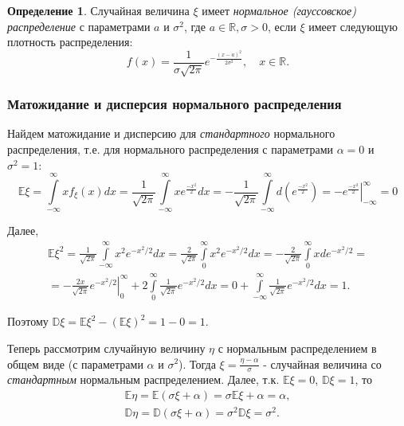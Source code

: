 \documentclass[oneside,final,14pt]{extreport}
\theoremstyle{plain}
\theoremstyle{definition}
\newtheorem*{defn}{Определение}
\theoremstyle{named}
\begin{document}
\begin{defn}
    Случайная величина $\xi$ имеет {\it нормальное (гауссовское) распределение} с параметрами $a$ и $\sigma^2$, где $a \in \mathbb{R}, \sigma > 0$, если $\xi$ имеет следующую плотность распределения: 
$$f(x)=\frac{1}{\sigma \sqrt{2 \pi}} e^{-\frac{(x-a)^{2}}{2 \sigma^{2}}}, \quad x \in \mathbb{R}.$$
\end{defn}

\subsubsection{Матожидание и дисперсия нормального распределения}

Найдем матожидание и дисперсию для {\it стандартного} нормального распределения, т.е. для нормального распределения с параметрами $\alpha = 0$ и $\sigma^2 = 1$:
\begin{equation*}
    \mathbb{E}\xi = 
    \int\limits_{-\infty}^{\infty} x f_{\xi}(x) dx =
    \frac{1}{\sqrt{2\pi}} \int\limits_{-\infty}^{\infty} x e^{\frac{-x^2}{2}} dx = 
    -\frac{1}{\sqrt{2\pi}} \int\limits_{-\infty}^{\infty} d\left( e^{\frac{-x^2}{2}}\right) = 
    \left. -e^{\frac{-x^2}{2}}\right|_{-\infty}^{\infty} = 0
\end{equation*}

Далее, 
\begin{multline*}
    \mathbb{E} \xi^{2}=\frac{1}{\sqrt{2 \pi}} \int\limits_{-\infty}^{\infty} x^{2} e^{-x^{2} / 2} d x=\frac{2}{\sqrt{2 \pi}} \int\limits_{0}^{\infty} x^{2} e^{-x^{2} / 2} d x=-\frac{2}{\sqrt{2 \pi}} \int\limits_{0}^{\infty} x d e^{-x^{2} / 2}= \\
    =-\left.\frac{2 x}{\sqrt{2 \pi}} e^{-x^{2} / 2}\right|_{0} ^{\infty}+2 \int\limits_{0}^{\infty} \frac{1}{\sqrt{2 \pi}} e^{-x^{2} / 2} d x=0+\int\limits_{-\infty}^{\infty} \frac{1}{\sqrt{2 \pi}} e^{-x^{2} / 2} d x=1.
\end{multline*}

Поэтому $\mathbb{D}\xi = \mathbb{E}\xi^2 - (\mathbb{E}\xi)^2 = 1 - 0 = 1.$

Теперь рассмотрим случайную величину $\eta$ с нормальным распределением в общем виде (с параметрами $\alpha$ и $\sigma^2$). Тогда $\xi = \frac{\eta - \alpha}{\sigma}$ - случайная величина со {\it стандартным} нормальным распределением. Далее, т.к. $\mathbb{E}\xi = 0$, $\mathbb{D}\xi = 1$, то 
\begin{gather*}
    \mathbb{E}\eta = \mathbb{E}(\sigma \xi + \alpha) = \sigma \mathbb{E} \xi + \alpha = \alpha, \\
    \mathbb{D}\eta = \mathbb{D}(\sigma \xi + \alpha) = \sigma^2 \mathbb{D}\xi = \sigma^2.
\end{gather*}
\end{document}
